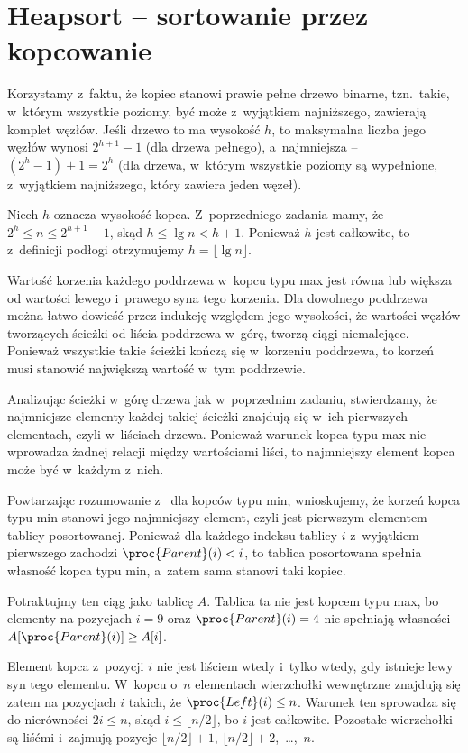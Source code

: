 \chapter{Heapsort -- sortowanie przez kopcowanie}


\exercise %
Korzystamy z~faktu, że kopiec stanowi prawie pełne drzewo binarne, tzn.\ takie, w~którym wszystkie poziomy, być może z~wyjątkiem najniższego, zawierają komplet węzłów. Jeśli drzewo to ma wysokość $h$, to maksymalna liczba jego węzłów wynosi $2^{h+1}-1$ (dla drzewa pełnego), a~najmniejsza -- $(2^h-1)+1=2^h$ (dla drzewa, w~którym wszystkie poziomy są wypełnione, z~wyjątkiem najniższego, który zawiera jeden węzeł).

\exercise %
Niech $h$ oznacza wysokość kopca. Z~poprzedniego zadania mamy, że $2^h\le n\le 2^{h+1}-1$, skąd $h\le\lg n<h+1$. Ponieważ $h$ jest całkowite, to z~definicji podłogi otrzymujemy $h=\lfloor\lg n\rfloor$.

\exercise %
Wartość korzenia każdego poddrzewa w~kopcu typu max jest równa lub większa od wartości lewego i~prawego syna tego korzenia. Dla dowolnego poddrzewa można łatwo dowieść przez indukcję względem jego wysokości, że wartości węzłów tworzących ścieżki od liścia poddrzewa w~górę, tworzą ciągi niemalejące. Ponieważ wszystkie takie ścieżki kończą się w~korzeniu poddrzewa, to korzeń musi stanowić największą wartość w~tym poddrzewie.

\exercise %
Analizując ścieżki w~górę drzewa jak w~poprzednim zadaniu, stwierdzamy, że najmniejsze elementy każdej takiej ścieżki znajdują się w~ich pierwszych elementach, czyli w~liściach drzewa. Ponieważ warunek kopca typu max nie wprowadza żadnej relacji między wartościami liści, to najmniejszy element kopca może być w~każdym z~nich.

\exercise %
Powtarzając rozumowanie z~ dla kopców typu min, wnioskujemy, że korzeń kopca typu min stanowi jego najmniejszy element, czyli jest pierwszym elementem tablicy posortowanej. Ponieważ dla każdego indeksu tablicy $i$ z~wyjątkiem pierwszego zachodzi $\proc{Parent}(i)<i$, to tablica posortowana spełnia własność kopca typu min, a~zatem sama stanowi taki kopiec.

\exercise %
Potraktujmy ten ciąg jako tablicę $A$. Tablica ta nie jest kopcem typu max, bo elementy na pozycjach $i=9$ oraz $\proc{Parent}(i)=4$ nie spełniają własności $A[\proc{Parent}(i)]\ge A[i]$.

\exercise %
Element kopca z~pozycji $i$ nie jest liściem wtedy i~tylko wtedy, gdy istnieje lewy syn tego elementu. W~kopcu o~$n$ elementach wierzchołki wewnętrzne znajdują się zatem na pozycjach $i$ takich, że $\proc{Left}(i)\le n$. Warunek ten sprowadza się do nierówności $2i\le n$, skąd $i\le\lfloor n/2\rfloor$, bo $i$ jest całkowite. Pozostałe wierzchołki są liśćmi i~zajmują pozycje $\lfloor n/2\rfloor+1$, $\lfloor n/2\rfloor+2$,~\dots,~$n$.

